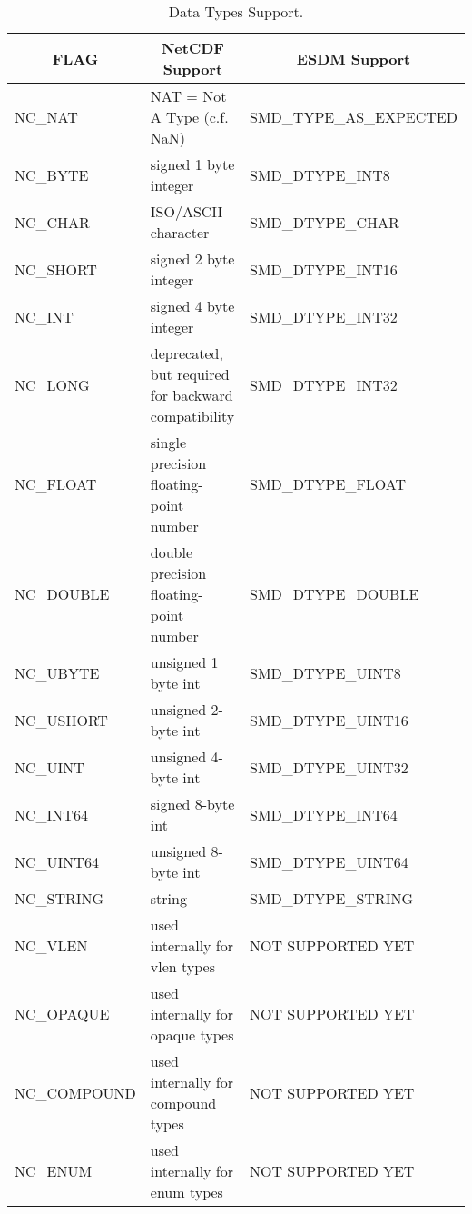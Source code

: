 \begin{table}[H]
\centering
\begin{tabular}{|l|m{6.4cm}|l|}
\hline
\multicolumn{1}{|c|}{FLAG} & \multicolumn{1}{|c|}{NetCDF Support} & \multicolumn{1}{|c|}{ESDM Support} \\ \hline \hline
NC\_NAT & NAT = Not A Type (c.f. NaN) &    SMD\_TYPE\_AS\_EXPECTED        \\ \hline
NC\_BYTE & signed 1 byte integer &     SMD\_DTYPE\_INT8        \\ \hline
NC\_CHAR & ISO/ASCII character &      SMD\_DTYPE\_CHAR       \\ \hline
NC\_SHORT & signed 2 byte integer &   SMD\_DTYPE\_INT16          \\ \hline
NC\_INT & signed 4 byte integer &     SMD\_DTYPE\_INT32        \\ \hline
NC\_LONG & deprecated, but required for backward compatibility &    SMD\_DTYPE\_INT32         \\ \hline
NC\_FLOAT & single precision floating-point number &   SMD\_DTYPE\_FLOAT           \\ \hline
NC\_DOUBLE & double precision floating-point number &   SMD\_DTYPE\_DOUBLE          \\ \hline
NC\_UBYTE & unsigned 1 byte int &     SMD\_DTYPE\_UINT8        \\ \hline
NC\_USHORT & unsigned 2-byte int &    SMD\_DTYPE\_UINT16         \\ \hline
NC\_UINT & unsigned 4-byte int &   SMD\_DTYPE\_UINT32          \\ \hline
NC\_INT64 & signed 8-byte int &    SMD\_DTYPE\_INT64         \\ \hline
NC\_UINT64 & unsigned 8-byte int &    SMD\_DTYPE\_UINT64         \\ \hline
NC\_STRING & string &    SMD\_DTYPE\_STRING         \\ \hline
NC\_VLEN & used internally for vlen types &      NOT SUPPORTED YET       \\ \hline
NC\_OPAQUE & used internally for opaque types &     NOT SUPPORTED YET        \\ \hline
NC\_COMPOUND & used internally for compound types &    NOT SUPPORTED YET         \\ \hline
NC\_ENUM & used internally for enum types &       NOT SUPPORTED YET      \\ \hline \hline
\end{tabular}
\caption{\label{datatypes-netcdf} Data Types Support.}
\end{table}

